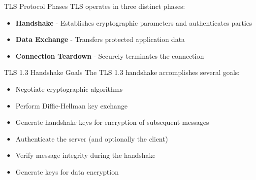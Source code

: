 \begin{definition}{TLS Protocol Phases}
TLS operates in three distinct phases:
\begin{itemize}
    \item \textbf{Handshake} - Establishes cryptographic parameters and authenticates parties
    \item \textbf{Data Exchange} - Transfers protected application data
    \item \textbf{Connection Teardown} - Securely terminates the connection
\end{itemize}
\end{definition}


\begin{concept}{TLS 1.3 Handshake Goals}
The TLS 1.3 handshake accomplishes several goals:
\begin{itemize}
    \item Negotiate cryptographic algorithms
    \item Perform Diffie-Hellman key exchange
    \item Generate handshake keys for encryption of subsequent messages
    \item Authenticate the server (and optionally the client)
    \item Verify message integrity during the handshake
    \item Generate keys for data encryption
\end{itemize}
\end{concept}

